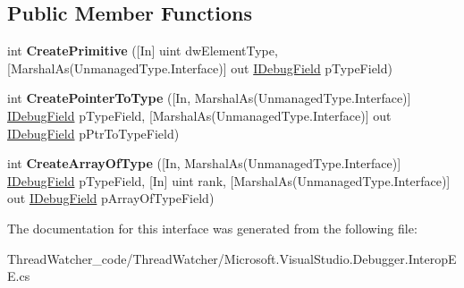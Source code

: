 \subsection*{Public Member Functions}
\begin{DoxyCompactItemize}
\item 
\hypertarget{interface_microsoft_1_1_visual_studio_1_1_debugger_1_1_interop_e_e_1_1_i_debug_type_field_builder2_a0094ae423108195f3df9ce09a4434a78}{int {\bfseries Create\+Primitive} (\mbox{[}In\mbox{]} uint dw\+Element\+Type, \mbox{[}Marshal\+As(Unmanaged\+Type.\+Interface)\mbox{]} out \hyperlink{interface_microsoft_1_1_visual_studio_1_1_debugger_1_1_interop_e_e_1_1_i_debug_field}{I\+Debug\+Field} p\+Type\+Field)}\label{interface_microsoft_1_1_visual_studio_1_1_debugger_1_1_interop_e_e_1_1_i_debug_type_field_builder2_a0094ae423108195f3df9ce09a4434a78}

\item 
\hypertarget{interface_microsoft_1_1_visual_studio_1_1_debugger_1_1_interop_e_e_1_1_i_debug_type_field_builder2_a1d84f9d14fa429c745bb12bbc8fff129}{int {\bfseries Create\+Pointer\+To\+Type} (\mbox{[}In, Marshal\+As(Unmanaged\+Type.\+Interface)\mbox{]} \hyperlink{interface_microsoft_1_1_visual_studio_1_1_debugger_1_1_interop_e_e_1_1_i_debug_field}{I\+Debug\+Field} p\+Type\+Field, \mbox{[}Marshal\+As(Unmanaged\+Type.\+Interface)\mbox{]} out \hyperlink{interface_microsoft_1_1_visual_studio_1_1_debugger_1_1_interop_e_e_1_1_i_debug_field}{I\+Debug\+Field} p\+Ptr\+To\+Type\+Field)}\label{interface_microsoft_1_1_visual_studio_1_1_debugger_1_1_interop_e_e_1_1_i_debug_type_field_builder2_a1d84f9d14fa429c745bb12bbc8fff129}

\item 
\hypertarget{interface_microsoft_1_1_visual_studio_1_1_debugger_1_1_interop_e_e_1_1_i_debug_type_field_builder2_ae35048a2a2d5169350cc0876442a30f4}{int {\bfseries Create\+Array\+Of\+Type} (\mbox{[}In, Marshal\+As(Unmanaged\+Type.\+Interface)\mbox{]} \hyperlink{interface_microsoft_1_1_visual_studio_1_1_debugger_1_1_interop_e_e_1_1_i_debug_field}{I\+Debug\+Field} p\+Type\+Field, \mbox{[}In\mbox{]} uint rank, \mbox{[}Marshal\+As(Unmanaged\+Type.\+Interface)\mbox{]} out \hyperlink{interface_microsoft_1_1_visual_studio_1_1_debugger_1_1_interop_e_e_1_1_i_debug_field}{I\+Debug\+Field} p\+Array\+Of\+Type\+Field)}\label{interface_microsoft_1_1_visual_studio_1_1_debugger_1_1_interop_e_e_1_1_i_debug_type_field_builder2_ae35048a2a2d5169350cc0876442a30f4}

\end{DoxyCompactItemize}


The documentation for this interface was generated from the following file\+:\begin{DoxyCompactItemize}
\item 
Thread\+Watcher\+\_\+code/\+Thread\+Watcher/Microsoft.\+Visual\+Studio.\+Debugger.\+Interop\+E\+E.\+cs\end{DoxyCompactItemize}
